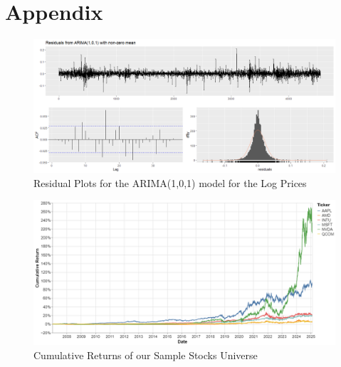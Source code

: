 \documentclass[12pt]{article}
\begin{document}
\section*{Appendix}
\begin{appendices}
\begin{figure}[h]
	\centering
	\includegraphics[width=1\linewidth]{plots/residual_plot_1_1.png}
	\caption{Residual Plots for the ARIMA(1,0,1) model for the Log Prices}
	\label{fig:residual_plot_1_1}
\end{figure}

\begin{figure}[!h]
	\centering
	\includegraphics[width=0.9\linewidth]{plots/cumulative_returns.png}
	\caption{Cumulative Returns of our Sample Stocks Universe}
	\label{fig:cumulative_returns}
\end{figure}

\end{appendices}
\end{document}
